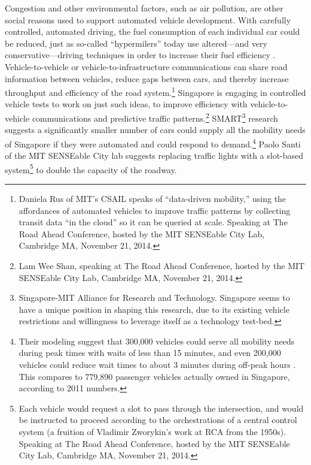 Congestion and other environmental factors, such as air pollution, are
other social reasons used to support automated vehicle development.
With carefully controlled, automated driving, the fuel consumption of each
individual car could be reduced, just as so-called ``hypermilers''
today use altered---and very conservative---driving techniques in
order to increase their fuel efficiency \cite{orourkeHypermile}.
Vehicle-to-vehicle or vehicle-to-infrastructure communications can
share road information between vehicles, reduce gaps between cars, and
thereby increase throughput and efficiency of the road
system.\footnote{Daniela Rus of MIT's CSAIL speaks of ``data-driven
  mobility,'' using
the affordances of automated vehicles to improve traffic
patterns by collecting transit data ``in the cloud'' so it can be
queried at scale. Speaking at The Road Ahead Conference, hosted by
  the MIT SENSEable City Lab, Cambridge MA, November 21, 2014.} Singapore is engaging in
controlled vehicle tests to work on just such ideas, to improve
efficiency with vehicle-to-vehicle communications and predictive traffic
patterns.\footnote{Lam Wee Shan, speaking at The Road Ahead Conference, hosted by
  the MIT SENSEable City Lab, Cambridge MA, November 21, 2014.}
SMART\footnote{Singapore-MIT Alliance for Research and Technology. Singapore seems to have a unique position in shaping this research,
  due to its existing vehicle
  restrictions and willingness to 
  leverage itself as a technology test-bed.}
research suggests a
significantly smaller number of cars could supply all the mobility
needs of Singapore if they were automated and could respond to
demand.\footnote{Their modeling suggest that 300,000
  vehicles could serve 
all mobility needs during peak times with waits of less than 15
minutes, and even 200,000 vehicles could reduce wait times
to about 3 minutes during off-peak hours \cite{frazzoliSingapore}. This
compares to 779,890 passenger vehicles actually owned in Singapore,
according to 2011 numbers.} Paolo
Santi of the MIT SENSEable City lab suggests replacing traffic lights
with a slot-based system\footnote{Each vehicle would request a slot to pass through the
intersection, and would be instructed to proceed according to the
orchestrations of a central control system (a fruition of
Vladimir Zworykin's work at RCA from the 1950s). Speaking at The Road Ahead Conference, hosted by
  the MIT SENSEable City Lab, Cambridge MA, November 21, 2014.} to double the capacity of the
roadway.


